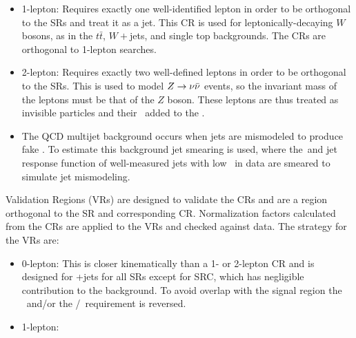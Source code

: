 \begin{itemize}
	\item 1-lepton: Requires exactly one well-identified lepton in order to be orthogonal to the SRs and treat it as a jet.  This CR is used for leptonically-decaying $W$ bosons, as in the $t\bar{t}$, $W+$jets, and single top backgrounds.  The CRs are orthogonal to 1-lepton searches.
	\item 2-lepton: Requires exactly two well-defined leptons in order to be orthogonal to the SRs.  This is used to model $Z\rightarrow \nu \bar{\nu}$ events, so the invariant mass of the leptons must be that of the $Z$ boson.  These leptons are thus treated as invisible particles and their \pt\ added to the \met.
	\item The QCD multijet background occurs when jets are mismodeled to produce fake \met.  To estimate this background jet smearing\cite{jetSmearing} is used, where the\pt\ and jet response function of well-measured jets with low \met\ in data are smeared to simulate jet mismodeling.
\end{itemize} 



Validation Regions (VRs) are designed to validate the CRs and are a region orthogonal to the SR and corresponding CR.  Normalization factors calculated from the CRs are applied to the VRs and checked against data.  The strategy for the VRs are:

\begin{itemize}
	\item 0-lepton: This is closer kinematically than a 1- or 2-lepton CR and is designed for \Zboson +jets for all SRs except for SRC, which has negligible contribution to the background.  To avoid overlap with the signal region the \drbjetbjet\ and/or the \mantikttwelvezero/\mantikteightzero\ requirement is reversed. 
	\item 1-lepton: 
\end{itemize}









